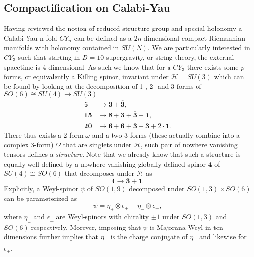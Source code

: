 \subsection{Compactification on Calabi-Yau}
Having reviewed the notion of reduced structure group and special holonomy a Calabi-Yau n-fold $CY_{n}$ can be defined as a $2n$-dimensional compact Riemannian manifolds with holonomy contained in $SU(N)$\cite{Blumenhagen2013}. We are particularly interested in $CY_3$ such that starting in $D=10$ supergravity, or string theory, the external spacetime is 4-dimensional. As such we know that for a $CY_3$ there exists some $p$-forms, or equivalently a Killing spinor, invariant under $\mathscr{H}=SU(3)$ which can be found by looking at the decomposition of 1-, 2- and 3-forms of $SO(6)\cong SU(4)\to SU(3)$
\begin{align*}
    \mathbf{6}&\to \mathbf{3}+\mathbf{\overbar{3}},\\
    \mathbf{15}&\to \mathbf{8}+\mathbf{3}+\overbar{\mathbf{3}}+\mathbf{1},\\
    \mathbf{20}&\to \mathbf{6}+\overbar{\mathbf{6}}+\mathbf{3}+\overbar{\mathbf{3}}+2\cdot\mathbf{1}.
\end{align*}
There thus exists a 2-form $\omega$ and a two 3-forms (these actually combine into a complex 3-form) $\Omega$ that are singlets under $\mathscr{H}$, such pair of nowhere vanishing tensors defines a \emph{structure}. Note that we already know that such a structure is equally well defined by a nowhere vanishing globally defined spinor $\mathbf{4}$ of $SU(4)\cong SO(6)$ that decomposes under $\mathscr{H}$ as 
\begin{equation}
    \mathbf{4}\to \mathbf{3}+\mathbf{1}.
\end{equation}
Explicitly, a Weyl-spinor $\psi$ of $SO(1,9)$ decomposed under $SO(1,3)\times SO(6)$ can be parameterized as 
\begin{equation}
    \psi = \eta_+\otimes\epsilon_++\eta_-\otimes\epsilon_-,
\end{equation}
where $\eta_\pm$ and $\epsilon_\pm$ are Weyl-spinors with chirality $\pm 1$ under $SO(1,3)$ and $SO(6)$ respectively. Morever, imposing that $\psi$ is Majorana-Weyl in ten dimensions further implies that $\eta_+$ is the charge conjugate of $\eta_-$ and likewise for $\epsilon_\pm$.

